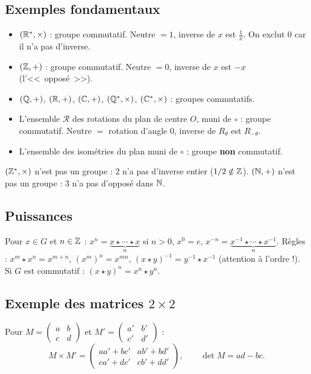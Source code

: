 \subsection{Exemples fondamentaux}

\begin{exbox}
\begin{itemize}[leftmargin=1cm]
  \item $(\mathbb{R}^*, \times)$ : groupe commutatif. Neutre $= 1$, inverse de $x$ est $\frac{1}{x}$. On exclut $0$ car il n'a pas d'inverse.
  \item $(\mathbb{Z}, +)$ : groupe commutatif. Neutre $= 0$, inverse de $x$ est $-x$ (l'<<~opposé~>>).
  \item $(\mathbb{Q}, +)$, $(\mathbb{R}, +)$, $(\mathbb{C}, +)$, $(\mathbb{Q}^*, \times)$, $(\mathbb{C}^*, \times)$ : groupes commutatifs.
  \item L'ensemble $\mathcal{R}$ des rotations du plan de centre $O$, muni de $\circ$ : groupe commutatif. Neutre $=$ rotation d'angle $0$, inverse de $R_\theta$ est $R_{-\theta}$.
  \item L'ensemble des isométries du plan muni de $\circ$ : groupe \textbf{non} commutatif.
\end{itemize}
\end{exbox}

\begin{exbox}
$(\mathbb{Z}^*, \times)$ n'est pas un groupe : $2$ n'a pas d'inverse entier ($1/2 \notin \mathbb{Z}$). $(\mathbb{N}, +)$ n'est pas un groupe : $3$ n'a pas d'opposé dans $\mathbb{N}$.
\end{exbox}

\subsection{Puissances}

Pour $x \in G$ et $n \in \mathbb{Z}$ : $x^n = \underbrace{x \star \cdots \star x}_{n}$ si $n > 0$, $x^0 = e$, $x^{-n} = \underbrace{x^{-1} \star \cdots \star x^{-1}}_{n}$. Règles : $x^m \star x^n = x^{m+n}$, $(x^m)^n = x^{mn}$, $(x \star y)^{-1} = y^{-1} \star x^{-1}$ (attention à l'ordre !). Si $G$ est commutatif : $(x \star y)^n = x^n \star y^n$.

\subsection{Exemple des matrices $2 \times 2$}

\begin{defbox}
Pour $M = \begin{pmatrix} a & b \\ c & d \end{pmatrix}$ et $M' = \begin{pmatrix} a' & b' \\ c' & d' \end{pmatrix}$ :
\[M \times M' = \begin{pmatrix} aa'+bc' & ab'+bd' \\ ca'+dc' & cb'+dd' \end{pmatrix}, \qquad \det M = ad - bc.\]
\end{defbox}

